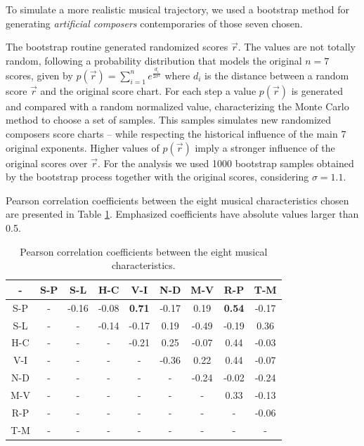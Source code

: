 \documentclass[
 aip,
 jmp,
 amsmath,amssymb,
 reprint,
]{revtex4-1}
\begin{document}
To simulate a more realistic musical trajectory, we used a bootstrap
method for generating \emph{artificial composers} contemporaries of those seven chosen.

The bootstrap routine generated randomized scores $\vec{r}$. The
values are not totally random, following a probability distribution
that models the original $n = 7$ scores, given by 
$p(\vec{r}) = \sum^n_{i=1} e^{\frac{d_i}{2\sigma^2}}$
where $d_i$ is the distance between a random score $\vec{r}$
and the original score chart. For each step a
value $p(\vec{r})$ is generated and compared with a random normalized value,
characterizing the Monte Carlo~\cite{Robert2011} method to choose a set of samples. This
samples simulates new randomized composers score charts -- while respecting the
historical influence of the main 7 original exponents. Higher
values of $p(\vec{r})$ imply a stronger influence of the original scores
over $\vec{r}$. For the analysis
we used 1000 bootstrap samples obtained by the bootstrap process
together with the original scores,
considering $\sigma = 1.1$. %

Pearson correlation coefficients between the eight musical
characteristics chosen are presented in Table \ref{tab:tableB}.
Emphasized coefficients have absolute values larger than 0.5.

\begin{table}[ht]
\caption{\label{tab:tableB}Pearson correlation coefficients between
  the eight musical characteristics.}

\begin{ruledtabular}
\begin{tabular}{|c||c|c|c|c|c|c|c|c|}

-   &  S-P  &  S-L   &  H-C   &  V-I            &  N-D  &  M-V    &  R-P           &  T-M  \\ \hline
S-P & -     &  -0.16 &  -0.08 &  \textbf{0.71}  & -0.17 &  0.19   &  \textbf{0.54} &  -0.17 \\
S-L & -     &  -     &  -0.14 &  -0.17          &  0.19  &  -0.49  &  -0.19         &  0.36 \\
H-C & -     &  -     &  -     &  -0.21          &  0.25  &  -0.07  &  0.44          &  -0.03 \\
V-I & -     &  -     &  -     &  -              & -0.36 &  0.22   &  0.44          &  -0.07 \\
N-D & -     &  -     &  -     &  -              &  -    &  -0.24  &  -0.02          &  -0.24 \\
M-V & -     &  -     &  -     &  -              &  -    &  -      &  0.33          &  -0.13 \\
R-P & -     &  -     &  -     &  -              &  -    &  -      &  -             &  -0.06 \\
T-M & -     &  -     &  -     &  -              &  -    &  -      &  -             &  - \\

\end{tabular}
\end{ruledtabular}
\end{table}
\end{document}
